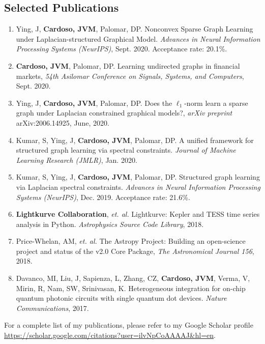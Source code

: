 \documentclass[10pt]{article}
\begin{document}
\begin{titlepage}
\section*{Selected Publications}
\begin{enumerate}
  \item Ying, J, \textbf{Cardoso, JVM}, Palomar, DP. Nonconvex Sparse Graph Learning under Laplacian-structured Graphical Model.
  \textit{Advances in Neural Information Processing Systems (NeurIPS)}, Sept. 2020. Acceptance rate: 20.1\%.
  \item \textbf{Cardoso, JVM}, Palomar, DP. Learning undirected graphs in financial markets, \textit{54th Asilomar Conference on Signals, Systems, and Computers}, Sept. 2020.
  \item Ying, J, \textbf{Cardoso, JVM}, Palomar, DP. Does the $\ell_1$-norm learn a sparse graph under Laplacian constrained graphical models?, \textit{arXiv preprint} arXiv:2006.14925, June, 2020.
  \item Kumar, S, Ying, J, \textbf{Cardoso, JVM}, Palomar, DP. A unified framework for structured graph
    learning via spectral constraints. \textit{Journal of Machine Learning Research (JMLR)}, Jan. 2020.
  \item Kumar, S, Ying, J, \textbf{Cardoso, JVM}, Palomar, DP. Structured graph learning via Laplacian
    spectral constraints. \textit{Advances in Neural Information Processing Systems (NeurIPS)}, Dec. 2019. Acceptance rate: 21.6\%.
  \item \textbf{Lightkurve Collaboration}, \textit{et. al.} Lightkurve: Kepler and TESS time series analysis in Python. \textit{Astrophysics Source Code Library}, 2018.
  \item Price-Whelan, AM, \textit{et. al.} The Astropy Project: Building an open-science project and status of the v2.0 Core Package, \textit{The Astronomical Journal 156}, 2018.
\item Davanco, MI, Liu, J, Sapienza, L, Zhang, CZ, \textbf{Cardoso, JVM}, Verma, V, Mirin, R, Nam,
SW, Srinivasan, K. Heterogeneous integration for on-chip quantum photonic circuits with single quantum dot devices.
\textit{Nature Communications}, 2017.
\end{enumerate}

For a complete list of my publications, please refer to my Google Scholar profile \url{https://scholar.google.com/citations?user=ilvNpCoAAAAJ&hl=en}.


\end{titlepage}
\end{document}
